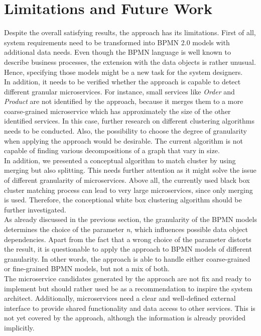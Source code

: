 \section{Limitations and Future Work}
\label{sec:Conclusion:LimitsFutureWork}
Despite the overall satisfying results, the approach has its limitations. First of all, system requirements need to be transformed into BPMN 2.0 models with additional data needs. Even though the BPMN language is well known to describe business processes, the extension with the data objects is rather unusual. Hence, specifying those models might be a new task for the system designers.  \\
In addition, it needs to be verified whether the approach is capable to detect different granular microservices. For instance, small services like \textit{Order} and \textit{Product} are not identified by the approach, because it merges them to a more coarse-grained microservice which has approximately the size of the other identified services. In this case, further research on different clustering algorithms needs to be conducted. Also, the possibility to choose the degree of granularity when applying the approach would be desirable. The current algorithm is not capable of finding various decompositions of a graph that vary in size. \\
In addition, we presented a conceptual algorithm to match cluster by using merging but also splitting. This needs further attention as it might solve the issue of different granularity of microservices.  Above all, the currently used black box cluster matching process can lead to very large microservices, since only merging is used. Therefore, the conceptional white box clustering algorithm should be further investigated. \\
As already discussed in the previous section, the granularity of the BPMN models determines the choice of the parameter \textit{n}, which influences possible data object dependencies. 
Apart from the fact that a wrong choice of the parameter distorts the result, it is questionable to apply the approach to BPMN models of different granularity. In other words, the approach is able to handle either coarse-grained or fine-grained BPMN models, but not a mix of both. \\
The microservice candidates generated by the approach are not fix and ready to implement but should rather used be as a recommendation to inspire the system architect. Additionally, microservices need a clear and well-defined external interface to provide shared functionality and data access to other services. This is not yet covered by the approach, although the information is already provided implicitly. 



